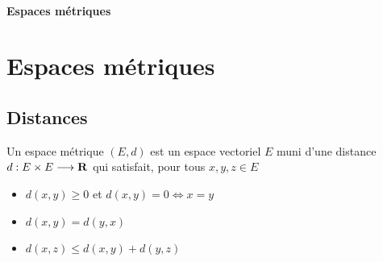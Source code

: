 \ifsolo
    ~

    \vspace{1cm}

    \begin{center}
        \textbf{\LARGE Espaces métriques} \\[1em]
    \end{center}
    \tableofcontents
\else
    \chapter{Espaces métriques}

    \minitoc
\fi
\thispagestyle{empty}

\section{Distances}

\begin{dfn}
    Un espace métrique $(E, d)$ est un espace vectoriel $E$ muni d'une distance $d:E\times E \longrightarrow  \mathbf R$ qui satisfait, pour tous $x,y,z \in  E$
    \begin{itemize}
        \item $d(x, y)\geq 0$ et $d(x, y)=0 \iff  x=y$
        \item $d(x, y)=d(y, x)$
        \item  $d(x, z)\leq d(x, y)+d(y, z)$
    \end{itemize}
\end{dfn}

